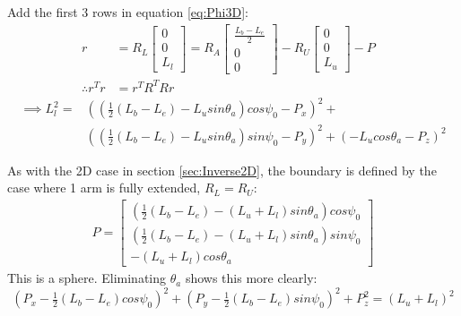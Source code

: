 Add the first 3 rows in equation \ref{eq:Phi3D}:
\begin{equation}
    \begin{aligned}
    r&= R_{L}\begin{bmatrix}0\\0\\L_l \end{bmatrix} = R_{A}\begin{bmatrix}\frac{L_b-L_e}{2}\\0\\0 \end{bmatrix} - R_{U}\begin{bmatrix}0\\0\\L_u  \end{bmatrix} - P  \\
\therefore    r^Tr&=r^TR^TRr &
    \end{aligned}
\end{equation}
\begin{equation}
\begin{split}
\implies L_l^2 =&\left(\left(\tfrac{1}{2}(L_b-L_e)-L_u sin\theta_{a}\right)cos\psi_0 -P_x\right)^2+ \\       &\left(\left(\tfrac{1}{2}(L_b-L_e)-L_usin\theta_{a}\right)sin\psi_0-P_y\right)^2+(-L_ucos\theta_{a}-P_z)^2
\end{split}
\end{equation}

As with the 2D case in section \ref{sec:Inverse2D}, the boundary is defined by the case where 1 arm is fully extended, $R_L=R_U$:
\begin{equation}
\begin{aligned}
P=\begin{bmatrix}
	 \left(\tfrac{1}{2}(L_b-L_e)-(L_u+L_l) sin\theta_{a}\right)cos\psi_0\\
	 \left(\tfrac{1}{2}(L_b-L_e)-(L_u+L_l) sin\theta_{a}\right)sin\psi_0\\
	-(L_u+L_l)cos\theta_a
\end{bmatrix}
\end{aligned}
\end{equation}
This is a sphere. Eliminating $\theta_a$ shows this more clearly:
\begin{equation}
(P_x-\tfrac{1}{2}(L_b-L_e)cos\psi_0)^2+(P_y-\tfrac{1}{2}(L_b-L_e)sin\psi_0)^2+P_z^2=(L_u+L_l)^2
\end{equation}

